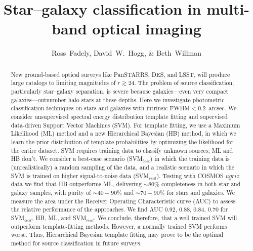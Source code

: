 \documentclass[12pt,preprint]{aastex}
\begin{document}
\title{Star--galaxy classification in multi-band optical imaging}
\author{Ross~Fadely,
        David~W.~Hogg,
        \& Beth~Willman}


%
%
\begin{abstract}
  New ground-based optical surveys like PanSTARRS, DES, and LSST, will
  produce large catalogs to limiting magnitudes of $r \gtrsim 24$.
  The problem of source classification, particularly star--galaxy
  separation, is severe because galaxies---even very compact
  galaxies---outnumber halo stars at these depths.  Here we
  investigate photometric classification techniques on stars and
  galaxies with intrinsic FWHM$<0.2$~arcsec.  We consider unsupervised
  spectral energy distribution template fitting and supervised
  data-driven Support Vector Machines (SVM).  For template fitting, we
  use a Maximum Likelihood (ML) method and a new Hierarchical Bayesian
  (HB) method, in which we learn the prior distribution of template
  probabilities by optimizing the likelihood for the entire dataset.
  SVM requires training data to classify unknown sources; ML and HB
  don't.  We consider a best-case scenario (SVM$_{best}$) in which the
  training data is (unrealistically) a random sampling of the data,
  and a realistic scenario in which the SVM is trained on higher
  signal-to-noise data (SVM$_{real}$).  Testing with COSMOS
  $ugriz$ data we find that HB outperforms ML, delivering $\sim80\%$
  completeness in both star and galaxy samples, with purity of
  $\sim40-90\%$ and $\sim70-90\%$ for stars and galaxies.  We measure
  the area under the Receiver Operating Characteristic curve (AUC) to
  assess the relative performance of the approaches.  We find AUC
  0.92, 0.88, 0.84, 0.70 for SVM$_{best}$, HB, ML, and SVM$_{real}$.
  We conclude, therefore, that a well trained SVM will outperform
  template-fitting methods.  However, a normally trained SVM performs
  worse.  Thus, Hierarchical Bayesian template fitting may prove to be
  the optimal method for source classification in future surveys.
\end{abstract}
\end{document}
